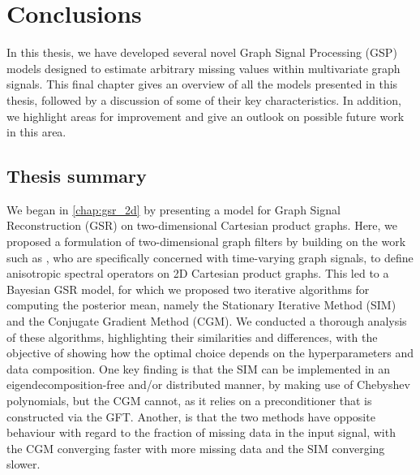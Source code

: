 \chapter{Conclusions} %

\label{chap:conclusions} %


In this thesis, we have developed several novel Graph Signal Processing (GSP) models designed to estimate arbitrary missing values within multivariate graph signals. This final chapter gives an overview of all the models presented in this thesis, followed by a discussion of some of their key characteristics. In addition, we highlight areas for improvement and give an outlook on possible future work in this area. 

\section{Thesis summary}

We began in \cref{chap:gsr_2d} by presenting a model for Graph Signal Reconstruction (GSR) on two-dimensional Cartesian product graphs. Here, we proposed a formulation of two-dimensional graph filters by building on the work such as \cite{Ioannidis2016,Grassi2018,Isufi2017,Loukas2016}, who are specifically concerned with time-varying graph signals, to define anisotropic spectral operators on 2D Cartesian product graphs. This led to a Bayesian GSR model, for which we proposed two iterative algorithms for computing the posterior mean, namely the Stationary Iterative Method (SIM) and the Conjugate Gradient Method (CGM). We conducted a thorough analysis of these algorithms, highlighting their similarities and differences, with the objective of showing how the optimal choice depends on the hyperparameters and data composition. One key finding is that the SIM can be implemented in an eigendecomposition-free and/or distributed manner, by making use of Chebyshev polynomials, but the CGM cannot, as it relies on a preconditioner that is constructed via the GFT. Another, is that the two methods have opposite behaviour with regard to the fraction of missing data in the input signal, with the CGM converging faster with more missing data and the SIM converging slower. 

